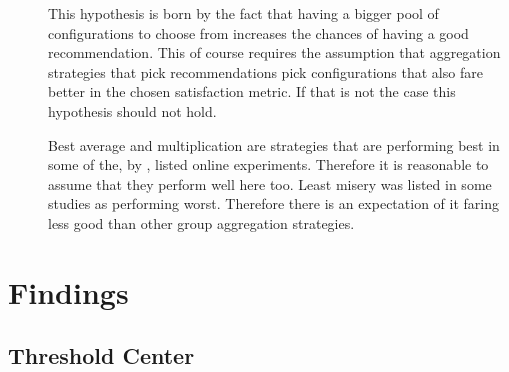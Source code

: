 \begin{description}
    \item[] This hypothesis is born by the fact that having a bigger pool of configurations to choose from increases the chances of having a good recommendation. This of course requires the assumption that aggregation strategies that pick recommendations pick configurations that also fare better in the chosen satisfaction metric. If that is not the case this hypothesis should not hold.  
    \item[] Best average and multiplication are strategies that are performing best in some of the, by \citeauthor{Masthoff2015} \cite[p. 755f]{Masthoff2015}, listed online experiments. Therefore it is reasonable to assume that they perform well here too. Least misery was listed in some studies as performing worst. Therefore there is an expectation of it faring less good than other group aggregation strategies.
\end{description}

\section{Findings}
\label{sec:Evaluation:Findings}

\subsection{Threshold Center}

